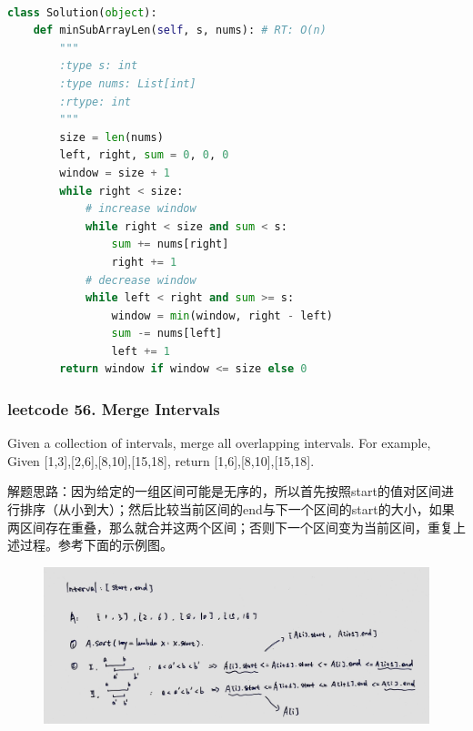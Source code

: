 \documentclass[a4paper,10pt]{article}
\begin{document}
\begin{lstlisting}[language=Python, caption=Problem209. Minimum Size Subarray Sum]

class Solution(object):
    def minSubArrayLen(self, s, nums): # RT: O(n)
        """
        :type s: int
        :type nums: List[int]
        :rtype: int
        """
        size = len(nums)
        left, right, sum = 0, 0, 0
        window = size + 1
        while right < size:
            # increase window
            while right < size and sum < s:
                sum += nums[right]
                right += 1
            # decrease window
            while left < right and sum >= s:
                window = min(window, right - left)
                sum -= nums[left]
                left += 1
        return window if window <= size else 0
\end{lstlisting}


\subsubsection{leetcode 56. Merge Intervals}
Given a collection of intervals, merge all overlapping intervals. For example, Given [1,3],[2,6],[8,10],[15,18], return [1,6],[8,10],[15,18]. \\

\begin{CJK*}{UTF8}{gbsn}
\noindent 解题思路：因为给定的一组区间可能是无序的，所以首先按照start的值对区间进行排序（从小到大）；然后比较当前区间的end与下一个区间的start的大小，如果两区间存在重叠，那么就合并这两个区间；否则下一个区间变为当前区间，重复上述过程。参考下面的示例图。
\end{CJK*}

\begin{figure}[h]
    \includegraphics[width=\textwidth]{leetcode56.jpg}
    \centering \\
\end{figure}
\end{document}
